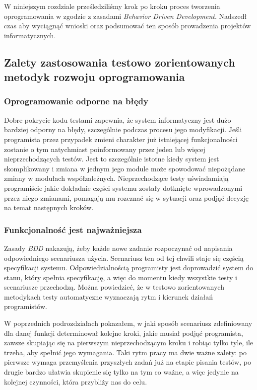   W niniejszym rozdziale prześledziliśmy krok po kroku proces tworzenia oprogramowania w zgodzie z zasadami \emph{Behavior Driven Development}. Nadszedł czas aby wyciągnąć wnioski oraz podsumować ten sposób prowadzenia projektów informatycznych.
  
  \subsection{Zalety zastosowania testowo zorientowanych metodyk rozwoju oprogramowania}
  
  \subsubsection{Oprogramowanie odporne na błędy}
    Dobre pokrycie kodu testami zapewnia, że system informatyczny jest dużo bardziej odporny na błędy, szczególnie podczas procesu jego modyfikacji. Jeśli programista przez przypadek zmieni charakter już istniejącej funkcjonalności zostanie o tym natychmiast poinformowany przez jeden lub więcej nieprzechodzących testów. Jest to szczególnie istotne kiedy system jest skomplikowany i zmiana w jednym jego module może spowodować niepożądane zmiany w modułach współzależnych. Nieprzechodzące testy uświadamiają programiście jakie dokładnie części systemu zostały dotknięte wprowadzonymi przez niego zmianami, pomagają mu rozeznać się w sytuacji oraz podjąć decyzję na temat następnych kroków.
    
  \subsubsection{Funkcjonalność jest najważniejsza}
  Zasady \emph{BDD} nakazują, żeby każde nowe zadanie rozpoczynać od napisania odpowiedniego scenariusza użycia. Scenariusz ten od tej chwili staje się częścią specyfikacji systemu. Odpowiedzialnością programisty jest doprowadzić system do stanu, który spełnia specyfikację, a więc do momentu kiedy wszystkie testy i scenariusze przechodzą. Można powiedzieć, że w testowo zorientowanych metodykach testy automatyczne wyznaczają rytm i kierunek działań programistów. 
    
  W poprzednich podrozdziałach pokazałem, w jaki sposób scenariusz zdefiniowany dla danej funkcji determinował kolejne kroki, jakie musiał podjąć programista, zawsze skupiając się na pierwszym nieprzechodzącym kroku i robiąc tylko tyle, ile trzeba, aby spełnić jego wymagania. Taki rytm pracy ma dwie ważne zalety: po pierwsze wymaga przemyślenia przyszłych zadań już na etapie pisania testów, po drugie bardzo ułatwia skupienie się tylko na tym co ważne, a więc jedynie na kolejnej czynności, która przybliży nas do celu.
    
